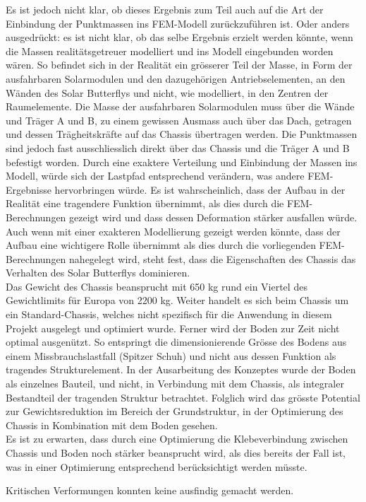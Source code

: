 Es ist jedoch nicht klar, ob dieses Ergebnis zum Teil auch auf die Art der Einbindung der Punktmassen ins FEM-Modell zurückzuführen ist. Oder anders ausgedrückt: es ist nicht klar, ob das selbe Ergebnis erzielt werden könnte, wenn die Massen realitätsgetreuer modelliert und ins Modell eingebunden worden wären. So befindet sich in der Realität ein grösserer Teil der Masse, in Form der ausfahrbaren Solarmodulen und den dazugehörigen Antriebselementen, an den Wänden des Solar Butterflys und nicht, wie modelliert, in den Zentren der Raumelemente.
Die Masse der ausfahrbaren Solarmodulen muss über die Wände und Träger A und B, zu einem gewissen Ausmass auch über das Dach, getragen und dessen Trägheitskräfte auf das Chassis übertragen werden. Die Punktmassen sind jedoch fast ausschliesslich direkt über das Chassis und die Träger A und B befestigt worden. Durch eine exaktere Verteilung und Einbindung der Massen ins Modell, würde sich der Lastpfad entsprechend verändern, was andere FEM-Ergebnisse hervorbringen würde.
Es ist wahrscheinlich, dass der Aufbau in der Realität eine tragendere Funktion übernimmt, als dies durch die FEM-Berechnungen gezeigt wird und dass dessen Deformation stärker ausfallen würde.\\
Auch wenn mit einer exakteren Modellierung gezeigt werden könnte, dass der Aufbau eine wichtigere Rolle übernimmt als dies durch die vorliegenden FEM-Berechnungen nahegelegt wird, steht fest, dass die Eigenschaften des Chassis das Verhalten des Solar Butterflys dominieren.\\

Das Gewicht des Chassis beansprucht mit 650 kg rund ein Viertel des Gewichtlimits für Europa von 2200 kg. Weiter handelt es sich beim Chassis um ein \glqq Standard-Chassis\grqq{}, welches nicht spezifisch für die Anwendung in diesem Projekt ausgelegt und optimiert wurde. Ferner wird der Boden zur Zeit nicht optimal ausgenützt. So entspringt die dimensionierende Grösse des Bodens aus einem Missbrauchslastfall (\glqq Spitzer Schuh\grqq{}) und nicht aus dessen Funktion als tragendes Strukturelement. In der Ausarbeitung des Konzeptes wurde der Boden als einzelnes Bauteil, und nicht, in Verbindung mit dem Chassis, als integraler Bestandteil der tragenden Struktur betrachtet. Folglich wird das grösste Potential zur Gewichtsreduktion im Bereich der Grundstruktur, in der Optimierung des Chassis in Kombination mit dem Boden gesehen.\\
Es ist zu erwarten, dass durch eine Optimierung die Klebeverbindung zwischen Chassis und Boden noch stärker beansprucht wird, als dies bereits der Fall ist, was in einer Optimierung entsprechend berücksichtigt werden müsste.

Kritischen Verformungen konnten keine ausfindig gemacht werden.

\newpage

